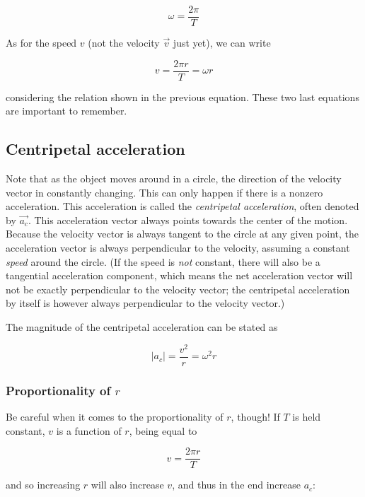 \begin{equation}
\omega = \frac{2 \pi}{T}
\end{equation}

As for the speed $v$ (not the velocity $\vec{v}$ just yet), we can write

\begin{equation}
v = \frac{2 \pi r}{T} = \omega r
\end{equation}

considering the relation shown in the previous equation. These two last equations are important to remember.

\subsection{Centripetal acceleration}

Note that as the object moves around in a circle, the direction of the velocity vector in constantly changing. This can only happen if there is a nonzero acceleration. This acceleration is called the \emph{centripetal acceleration}, often denoted by $\vec{a_c}$. This acceleration vector always points towards the center of the motion. Because the velocity vector is always tangent to the circle at any given point, the acceleration vector is always perpendicular to the velocity, assuming a constant \emph{speed} around the circle. (If the speed is \emph{not} constant, there will also be a tangential acceleration component, which means the net acceleration vector will not be exactly perpendicular to the velocity vector; the centripetal acceleration by itself is however always perpendicular to the velocity vector.)

The magnitude of the centripetal acceleration can be stated as

\begin{equation}
|a_c| = \frac{v^2}{r} = \omega^2 r
\end{equation}

\subsubsection{Proportionality of $r$}
Be careful when it comes to the proportionality of $r$, though! If $T$ is held constant, $v$ is a function of $r$, being equal to

\begin{equation}
v = \frac{2 \pi r}{T}
\end{equation}

and so increasing $r$ will also increase $v$, and thus in the end increase $a_c$:


